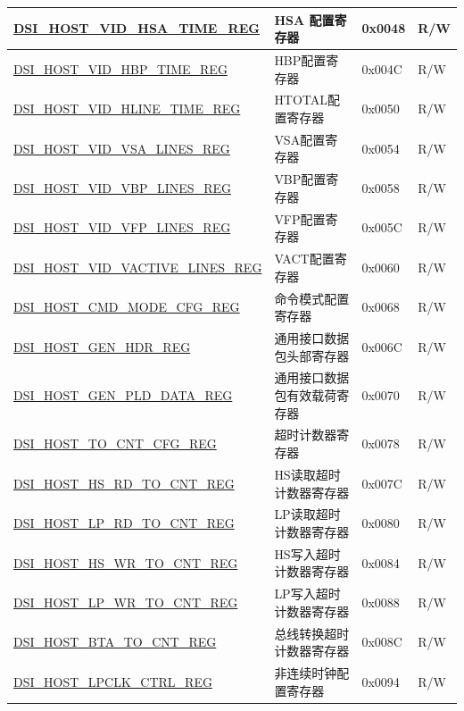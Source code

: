 \begin{longtable}{ | p{6.8cm} | p{6.5cm} | p{1.2cm} | p{1cm} | }
\hyperref[regdesc:DSIHOSTVIDHSATIMEREG]{DSI\_HOST\_VID\_HSA\_TIME\_REG} & HSA 配置寄存器 & 0x0048 & R/W \\ \hline
\hyperref[regdesc:DSIHOSTVIDHBPTIMEREG]{DSI\_HOST\_VID\_HBP\_TIME\_REG} & HBP配置寄存器 & 0x004C & R/W \\ \hline
\hyperref[regdesc:DSIHOSTVIDHLINETIMEREG]{DSI\_HOST\_VID\_HLINE\_TIME\_REG} & HTOTAL配置寄存器 & 0x0050 & R/W \\ \hline
\hyperref[regdesc:DSIHOSTVIDVSALINESREG]{DSI\_HOST\_VID\_VSA\_LINES\_REG} & VSA配置寄存器 & 0x0054 & R/W \\ \hline
\hyperref[regdesc:DSIHOSTVIDVBPLINESREG]{DSI\_HOST\_VID\_VBP\_LINES\_REG} & VBP配置寄存器 & 0x0058 & R/W \\ \hline
\hyperref[regdesc:DSIHOSTVIDVFPLINESREG]{DSI\_HOST\_VID\_VFP\_LINES\_REG} & VFP配置寄存器 & 0x005C & R/W \\ \hline
\hyperref[regdesc:DSIHOSTVIDVACTIVELINESREG]{DSI\_HOST\_VID\_VACTIVE\_LINES\_REG} & VACT配置寄存器 & 0x0060 & R/W \\ \hline
\hyperref[regdesc:DSIHOSTCMDMODECFGREG]{DSI\_HOST\_CMD\_MODE\_CFG\_REG} & 命令模式配置寄存器 & 0x0068 & R/W \\ \hline
\hyperref[regdesc:DSIHOSTGENHDRREG]{DSI\_HOST\_GEN\_HDR\_REG} & 通用接口数据包头部寄存器 & 0x006C & R/W \\ \hline
\hyperref[regdesc:DSIHOSTGENPLDDATAREG]{DSI\_HOST\_GEN\_PLD\_DATA\_REG} & 通用接口数据包有效载荷寄存器 & 0x0070 & R/W \\ \hline
\hyperref[regdesc:DSIHOSTTOCNTCFGREG]{DSI\_HOST\_TO\_CNT\_CFG\_REG} & 超时计数器寄存器 & 0x0078 & R/W \\ \hline
\hyperref[regdesc:DSIHOSTHSRDTOCNTREG]{DSI\_HOST\_HS\_RD\_TO\_CNT\_REG} & HS读取超时计数器寄存器 & 0x007C & R/W \\ \hline
\hyperref[regdesc:DSIHOSTLPRDTOCNTREG]{DSI\_HOST\_LP\_RD\_TO\_CNT\_REG} & LP读取超时计数器寄存器 & 0x0080 & R/W \\ \hline
\hyperref[regdesc:DSIHOSTHSWRTOCNTREG]{DSI\_HOST\_HS\_WR\_TO\_CNT\_REG} & HS写入超时计数器寄存器 & 0x0084 & R/W \\ \hline
\hyperref[regdesc:DSIHOSTLPWRTOCNTREG]{DSI\_HOST\_LP\_WR\_TO\_CNT\_REG} & LP写入超时计数器寄存器 & 0x0088 & R/W \\ \hline
\hyperref[regdesc:DSIHOSTBTATOCNTREG]{DSI\_HOST\_BTA\_TO\_CNT\_REG} & 总线转换超时计数器寄存器 & 0x008C & R/W \\ \hline
\hyperref[regdesc:DSIHOSTLPCLKCTRLREG]{DSI\_HOST\_LPCLK\_CTRL\_REG} & 非连续时钟配置寄存器 & 0x0094 & R/W \\ \hline

\end{longtable}
